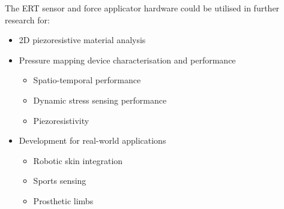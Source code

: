\noindent
The ERT sensor and force applicator hardware could be utilised in further research for:
\begin{itemize}
\item 2D piezoresistive material analysis
\item Pressure mapping device characterisation and performance
\begin{itemize}
	\item Spatio-temporal performance
	\item Dynamic stress sensing performance
	\item Piezoresistivity 
\end{itemize}
\item Development for real-world applications
\begin{itemize}
	\item Robotic skin integration
	\item Sports sensing
	\item Prosthetic limbs
\end{itemize}
\end{itemize}

